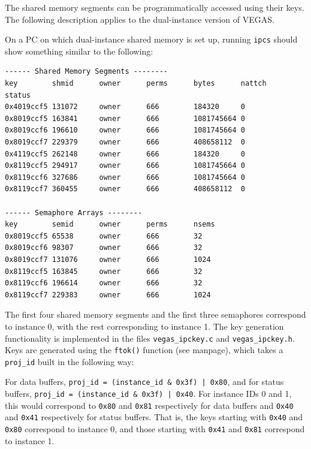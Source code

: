 \documentclass[11pt]{article} %
\begin{document}
The shared memory segments can be programmatically accessed using their keys.
The following description applies to the dual-instance version of VEGAS.

On a PC on which dual-instance shared memory is set up, running {\tt ipcs}
should show something similar to the following:

\begin{verbatim}
------ Shared Memory Segments --------
key        shmid      owner      perms      bytes      nattch     status      
0x4019ccf5 131072     owner      666        184320     0                       
0x8019ccf5 163841     owner      666        1081745664 0                       
0x8019ccf6 196610     owner      666        1081745664 0                       
0x8019ccf7 229379     owner      666        408658112  0                       
0x4119ccf5 262148     owner      666        184320     0                       
0x8119ccf5 294917     owner      666        1081745664 0                       
0x8119ccf6 327686     owner      666        1081745664 0                       
0x8119ccf7 360455     owner      666        408658112  0                       

------ Semaphore Arrays --------
key        semid      owner      perms      nsems     
0x8019ccf5 65538      owner      666        32        
0x8019ccf6 98307      owner      666        32        
0x8019ccf7 131076     owner      666        1024      
0x8119ccf5 163845     owner      666        32        
0x8119ccf6 196614     owner      666        32        
0x8119ccf7 229383     owner      666        1024      
\end{verbatim}

The first four shared memory segments and the first three semaphores correspond
to instance 0, with the rest corresponding to instance 1. The key generation
functionality is implemented in the files {\tt vegas\_ipckey.c} and {\tt vegas\_ipckey.h}.
Keys are generated using the {\tt ftok()} function (see manpage), which takes a {\tt proj\_id}
built in the following way:

For data buffers, {\tt proj\_id = (instance\_id \& 0x3f) | 0x80}, and for status buffers,
{\tt proj\_id = (instance\_id \& 0x3f) | 0x40}. For instance IDs 0 and 1, this would correspond to
{\tt 0x80} and {\tt 0x81} respectively for data buffers and {\tt 0x40} and {\tt 0x41} respectively
for status buffers. That is, the keys starting with {\tt 0x40} and {\tt 0x80} correspond to instance 0,
and those starting with {\tt 0x41} and {\tt 0x81} correspond to instance 1.
\end{document}
